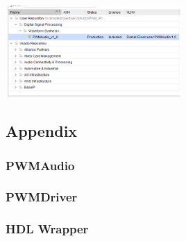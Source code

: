 \documentclass[11pt]{article}
\newcommand{\Newpage}{\end{preview}\begin{preview}}
\begin{document}
\begin{preview}
\begin{center}
  \includegraphics[width=0.5\textwidth]{inc/ip_added.PNG}
\end{center}

\Newpage
\section*{Appendix}
\subsubsection*{PWMAudio}


\Newpage
\subsubsection*{PWMDriver}


\Newpage
\subsubsection*{HDL Wrapper}

\end{preview}
\end{document}
